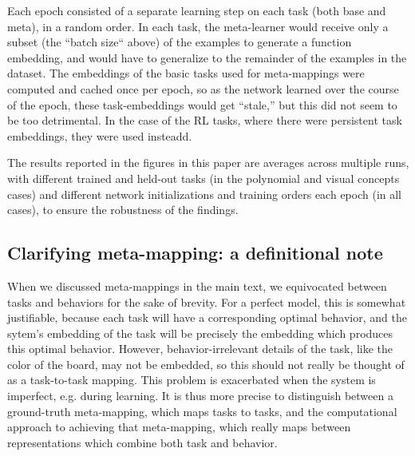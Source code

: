 Each epoch consisted of a separate learning step on each task (both base and meta), in a random order. In each task, the meta-learner would receive only a subset (the ``batch size`` above) of the examples to generate a function embedding, and would have to generalize to the remainder of the examples in the dataset. The embeddings of the basic tasks used for meta-mappings were computed and cached once per epoch, so as the network learned over the course of the epoch, these task-embeddings would get ``stale,'' but this did not seem to be too detrimental. In the case of the RL tasks, where there were persistent task embeddings, they were used insteadd.\par
The results reported in the figures in this paper are averages across multiple runs, with different trained and held-out tasks (in the polynomial and visual concepts cases) and different network initializations and training orders each epoch (in all cases), to ensure the robustness of the findings. \par

\subsection{Clarifying meta-mapping: a definitional note} \label{app_clarifying_meta_mapping}
When we discussed meta-mappings in the main text, we equivocated between tasks and behaviors for the sake of brevity. For a perfect model, this is somewhat justifiable, because each task will have a corresponding optimal behavior, and the sytem's embedding of the task will be precisely the embedding which produces this optimal behavior. However, behavior-irrelevant details of the task, like the color of the board, may not be embedded, so this should not really be thought of as a task-to-task mapping. This problem is exacerbated when the system is imperfect, e.g. during learning. It is thus more precise to distinguish between a ground-truth meta-mapping, which maps tasks to tasks, and the computational approach to achieving that meta-mapping, which really maps between representations which combine both task and behavior. \par

